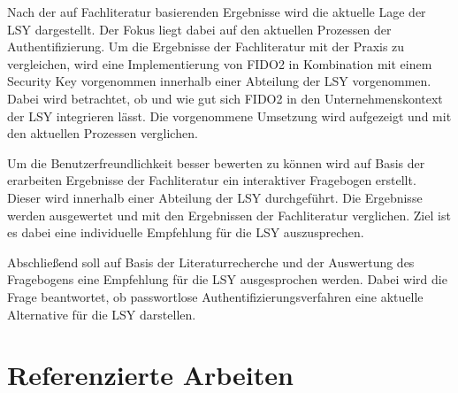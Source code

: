 Nach der auf Fachliteratur basierenden Ergebnisse wird die aktuelle Lage der \ac{LSY} dargestellt. Der Fokus liegt dabei auf den aktuellen Prozessen der Authentifizierung. Um die Ergebnisse der Fachliteratur mit der Praxis zu vergleichen, wird eine Implementierung von FIDO2 in Kombination mit einem Security Key vorgenommen innerhalb einer Abteilung der \ac{LSY} vorgenommen. Dabei wird betrachtet, ob und wie gut sich FIDO2 in den Unternehmenskontext der \ac{LSY} integrieren lässt. Die vorgenommene Umsetzung wird aufgezeigt und mit den aktuellen Prozessen verglichen.

Um die Benutzerfreundlichkeit besser bewerten zu können wird auf Basis der erarbeiten Ergebnisse der Fachliteratur ein interaktiver Fragebogen erstellt. Dieser wird innerhalb einer Abteilung der \ac{LSY} durchgeführt. Die Ergebnisse werden ausgewertet und mit den Ergebnissen der Fachliteratur verglichen. Ziel ist es dabei eine individuelle Empfehlung für die \ac{LSY} auszusprechen.

Abschließend soll auf Basis der Literaturrecherche und der Auswertung des Fragebogens eine Empfehlung für die \ac{LSY} ausgesprochen werden. Dabei wird die Frage beantwortet, ob passwortlose Authentifizierungsverfahren eine aktuelle Alternative für die \ac{LSY} darstellen.
\section{Referenzierte Arbeiten}